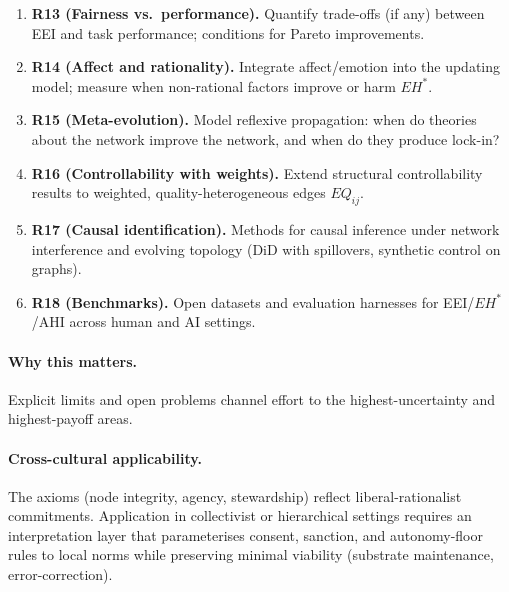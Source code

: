 \documentclass[12pt]{article}
\begin{document}
\begin{enumerate}[leftmargin=1.2em]
\item \textbf{R13 (Fairness vs.\ performance).} Quantify trade-offs (if any) between EEI and task performance; conditions for Pareto improvements.
\item \textbf{R14 (Affect and rationality).} Integrate affect/emotion into the updating model; measure when non-rational factors improve or harm $EH^{\ast}$.
\item \textbf{R15 (Meta-evolution).} Model reflexive propagation: when do theories about the network improve the network, and when do they produce lock-in?
\item \textbf{R16 (Controllability with weights).} Extend structural controllability results to weighted, quality-heterogeneous edges $EQ_{ij}$.
\item \textbf{R17 (Causal identification).} Methods for causal inference under network interference and evolving topology (DiD with spillovers, synthetic control on graphs).
\item \textbf{R18 (Benchmarks).} Open datasets and evaluation harnesses for EEI/$EH^{\ast}$/AHI across human and AI settings.
\end{enumerate}

\paragraph{Why this matters.} Explicit limits and open problems channel effort to the highest-uncertainty and highest-payoff areas.

\paragraph{Cross-cultural applicability.} The axioms (node integrity, agency, stewardship) reflect liberal-rationalist commitments. Application in collectivist or hierarchical settings requires an interpretation layer that parameterises consent, sanction, and autonomy-floor rules to local norms while preserving minimal viability (substrate maintenance, error-correction).
\end{document}
